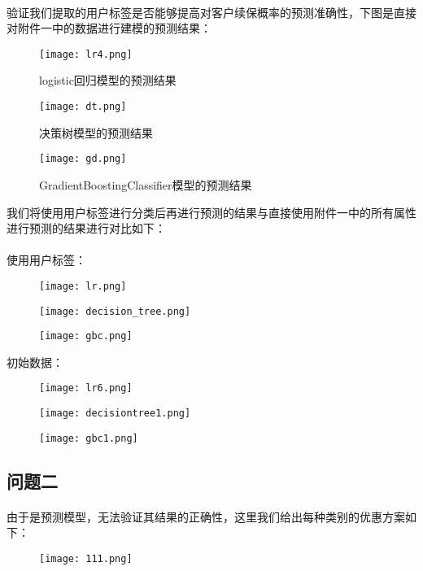 \documentclass[a4paper]{article}
\begin{document}
			\paragraph{}验证我们提取的用户标签是否能够提高对客户续保概率的预测准确性，下图是直接对附件一中的数据进行建模的预测结果：
			\begin{figure}[H]	
				\centering
				\texttt{[image: lr4.png]}
				\caption{logistic回归模型的预测结果}
			\end{figure}
			\begin{figure}[H]	
				\centering
				\texttt{[image: dt.png]}
				\caption{决策树模型的预测结果}
			\end{figure}
			\begin{figure}[H]	
				\centering
				\texttt{[image: gd.png]}
				\caption{GradientBoostingClassifier模型的预测结果}
			\end{figure}
			我们将使用用户标签进行分类后再进行预测的结果与直接使用附件一中的所有属性进行预测的结果进行对比如下：\\ \\
			使用用户标签：
				\begin{figure}[H]	
					\centering
					\texttt{[image: lr.png]}
				\end{figure}
				\begin{figure}[H]	
					\centering
					\texttt{[image: decision\_tree.png]}
				\end{figure}
				\begin{figure}[H]	
					\centering
					\texttt{[image: gbc.png]}
				\end{figure}
			初始数据：
				\begin{figure}[H]	
					\centering
					\texttt{[image: lr6.png]}
				\end{figure}
				\begin{figure}[H]	
					\centering
					\texttt{[image: decisiontree1.png]}
				\end{figure}
				\begin{figure}[H]	
					\centering
					\texttt{[image: gbc1.png]}
				\end{figure}
		\subsection{问题二}
		\paragraph{}由于是预测模型，无法验证其结果的正确性，这里我们给出每种类别的优惠方案如下：\\
			\begin{figure}[H]	
				\centering
				\texttt{[image: 111.png]}
			\end{figure}
\end{document}

